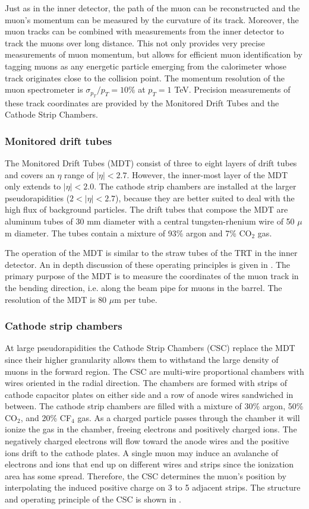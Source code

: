 Just as in the inner detector, the path of the muon can be reconstructed and
the muon's momentum can be measured by the curvature of its track. Moreover,
the muon tracks can be combined with measurements from the inner detector to 
track the muons over long distance.  This not only provides very precise measurements
of muon momentum, but allows for efficient muon identification by
tagging muons as any energetic particle emerging from the calorimeter whose track 
originates close to the collision point. The momentum resolution of the muon
spectrometer is $\sigma_{p_T}/p_T = 10\%$ at $p_T = 1$ TeV.
Precision measurements of these
track coordinates are provided by the Monitored Drift Tubes and the Cathode
Strip Chambers.

\subsubsection*{Monitored drift tubes}
The Monitored Drift Tubes (MDT) consist of three to eight layers of drift tubes
and covers an $\eta$ range of $|\eta| < 2.7$. However, the inner-most layer of
the MDT only extends to $|\eta| < 2.0$. The cathode strip chambers are installed at
the larger pseudorapidities ($2 < |\eta| < 2.7$), because they are better suited
to deal with the high flux of background particles. The drift tubes that
compose the MDT are aluminum tubes of 30 mm diameter with a central tungsten-rhenium
wire of 50 $\mu$m diameter. The tubes contain a mixture of 93\% argon and
7\% CO$_2$ gas.

The operation of the MDT is similar to the straw tubes of the TRT in the inner
detector. An in depth discussion of these operating principles is given
in . The primary purpose of the MDT is to measure the
coordinates of the muon track in the bending direction, i.e. along the
beam pipe for muons in the barrel. The resolution of the MDT is 80 $\mu$m per
tube.

\subsubsection*{Cathode strip chambers}
At large pseudorapidities the Cathode Strip Chambers (CSC) replace
the MDT since their higher granularity allows them to withstand the large
density of muons in the forward region. The CSC are multi-wire proportional
chambers with wires oriented in the radial direction. The chambers are formed
with strips of cathode capacitor plates on either side and a row of anode
wires sandwiched in between. The cathode strip chambers are filled with a mixture
of 30\% argon, 50\% CO$_2$, and 20\% CF$_4$ gas. As a charged particle passes
through the chamber it will ionize the gas in the chamber, freeing electrons
and positively charged ions. The negatively charged electrons will flow toward the
anode wires and the positive ions drift to the cathode plates. A single muon
may induce an avalanche of electrons and ions that end up on different wires
and strips since the ionization area has some spread. Therefore, the CSC
determines the muon's position by interpolating the induced positive charge on 
3 to 5 adjacent strips. 
The structure and operating principle of the CSC is shown in .

